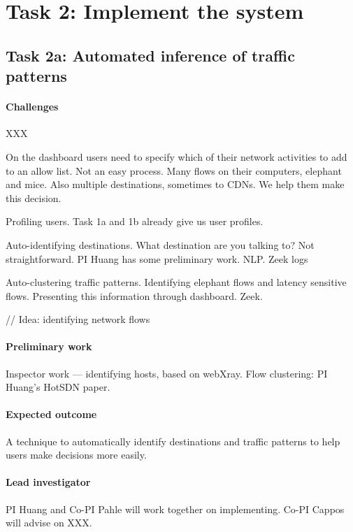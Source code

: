 \section{Task 2: Implement the system }



\subsection{Task 2a: Automated inference of traffic patterns}

\paragraph{Challenges} XXX

On the dashboard users need to specify which of their network activities to add to an allow list. Not an easy process. Many flows on their computers, elephant and mice. Also multiple destinations, sometimes to CDNs. We help them make this decision.

Profiling users. Task 1a and 1b already give us user profiles.

Auto-identifying destinations. What destination are you talking to? Not straightforward. PI Huang has some preliminary work. NLP. Zeek logs

Auto-clustering traffic patterns. Identifying elephant flows and latency sensitive flows. Presenting this information through dashboard.  Zeek.

// Idea: identifying network flows

\paragraph{Preliminary work} Inspector work — identifying hosts, based on webXray. Flow clustering: PI Huang's HotSDN paper.

\paragraph{Expected outcome} A technique to automatically identify destinations and traffic patterns to help users make decisions more easily.

\paragraph{Lead investigator} PI Huang and Co-PI Pahle will work together on implementing. Co-PI Cappos will advise on XXX.








